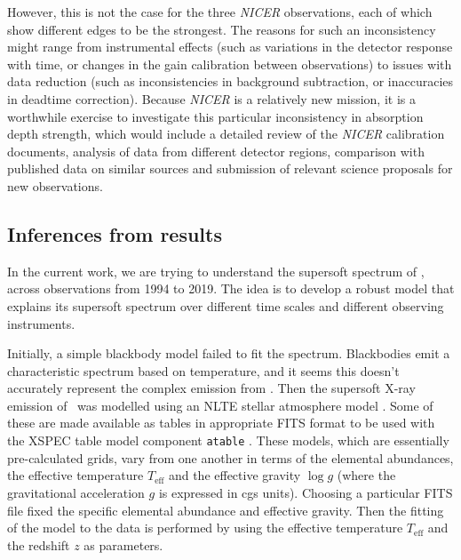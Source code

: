     However, this is not the case for the three \textit{NICER} observations, each of which show different edges to be the strongest. The reasons for such an inconsistency might range from instrumental effects (such as variations in the detector response with time, or changes in the gain calibration between observations) to issues with data reduction (such as inconsistencies in background subtraction, or inaccuracies in deadtime correction). Because \textit{NICER} is a relatively new mission, it is a worthwhile exercise to investigate this particular inconsistency in absorption depth strength, which would include a detailed review of the \textit{NICER} calibration documents, analysis of data from different detector regions, comparison with published data on similar sources and submission of relevant science proposals for new observations.
    
    \subsection{Inferences from results}
    In the current work, we are trying to understand the supersoft spectrum of \source, across observations from 1994 to 2019. The idea is to develop a robust model that explains its supersoft spectrum over different time scales and different observing instruments. %
    	
    Initially, a simple blackbody model failed to fit the spectrum. Blackbodies emit a characteristic spectrum based on temperature, and it seems this doesn't accurately represent the complex emission from \source. Then the supersoft X-ray emission of \source\ was modelled using an NLTE stellar atmosphere model \cite{werner1999classical}. Some of these are made available as tables in appropriate FITS format to be used with the XSPEC table model component \texttt{atable} \cite{rauch2003grid,rauch2010nlte}. These models, which are essentially pre-calculated grids, vary from one another in terms of the elemental abundances, the effective temperature $T_\text{eff}$ and the effective gravity $\log{g}$ (where the gravitational acceleration $g$ is expressed in cgs units). Choosing a particular FITS file fixed the specific elemental abundance and effective gravity. Then the fitting of the model to the data is performed by using the effective temperature $T_\text{eff}$ and the redshift $z$ as parameters.
    
